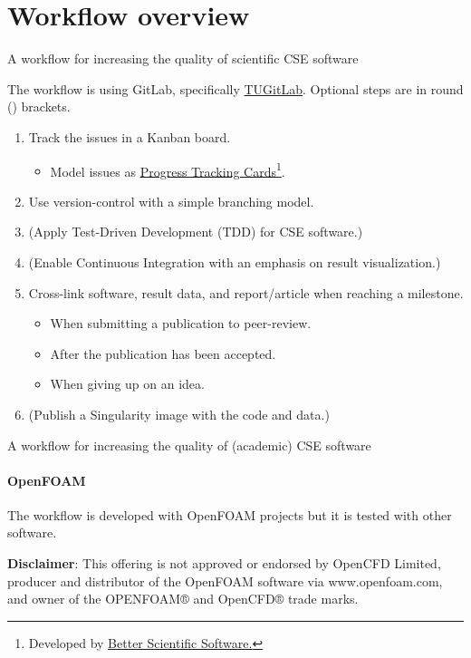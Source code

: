 \section{Workflow overview}

\begin{frame}{A workflow for increasing the quality of scientific CSE software} 

    \vfill
    The workflow is using GitLab, specifically \href{https://git.rwth-aachen.de/}{TUGitLab}. 
    Optional steps are in round () brackets.
    \begin{enumerate}
        \item Track the issues in a Kanban board. 
            \begin{itemize}
                \item Model issues as \href{https://betterscientificsoftware.github.io/PSIP-Tools/PTCs/}{Progress Tracking Cards}\footnote{Developed by \href{https://bssw.io/}{Better Scientific Software.}}.
            \end{itemize}
        \item Use version-control with a simple branching model. 
        \item (Apply Test-Driven Development (TDD) for CSE software.)
        \item (Enable Continuous Integration with an emphasis on result visualization.) 
        \item Cross-link software, result data, and report/article when reaching a milestone.
            \begin{itemize}
                \item When submitting a publication to peer-review. 
                \item After the publication has been accepted. 
                \item When giving up on an idea. 
            \end{itemize}
        \item (Publish a Singularity image with the code and data.)
    \end{enumerate}
\end{frame}

\begin{frame}{A workflow for increasing the quality of (academic) CSE software} 
    \framesubtitle{OpenFOAM}

        \vfill

        The workflow is developed with OpenFOAM projects but it is tested with other software. 

        \vspace{1cm}

        \textbf{Disclaimer}: This offering is not approved or endorsed by OpenCFD Limited, producer and distributor of the OpenFOAM software via www.openfoam.com, and owner of the OPENFOAM®  and OpenCFD®  trade marks. 

\end{frame}
